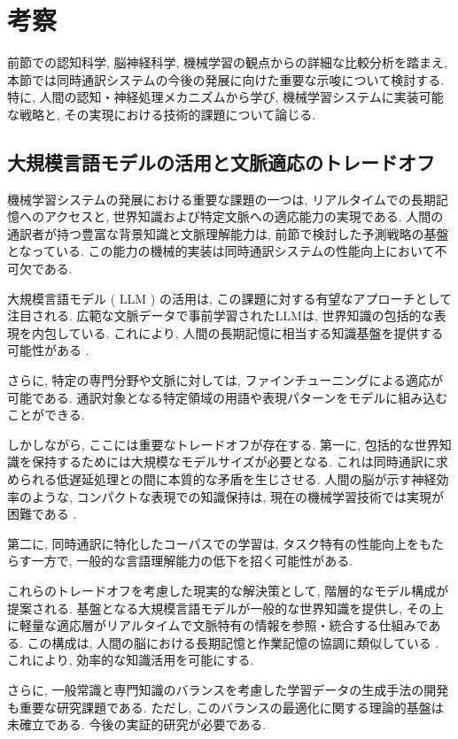 \section{考察}

前節での認知科学, 脳神経科学, 機械学習の観点からの詳細な比較分析を踏まえ, 本節では同時通訳システムの今後の発展に向けた重要な示唆について検討する.
特に, 人間の認知・神経処理メカニズムから学び, 機械学習システムに実装可能な戦略と, その実現における技術的課題について論じる.

\subsection{大規模言語モデルの活用と文脈適応のトレードオフ}

機械学習システムの発展における重要な課題の一つは, リアルタイムでの長期記憶へのアクセスと, 世界知識および特定文脈への適応能力の実現である.
人間の通訳者が持つ豊富な背景知識と文脈理解能力は, 前節で検討した予測戦略の基盤となっている.
この能力の機械的実装は同時通訳システムの性能向上において不可欠である.

大規模言語モデル ( LLM ) の活用は, この課題に対する有望なアプローチとして注目される.
広範な文脈データで事前学習されたLLMは, 世界知識の包括的な表現を内包している.
これにより, 人間の長期記憶に相当する知識基盤を提供する可能性がある \cite{agostinelli2024simulllm}.

さらに, 特定の専門分野や文脈に対しては, ファインチューニングによる適応が可能である.
通訳対象となる特定領域の用語や表現パターンをモデルに組み込むことができる.

しかしながら, ここには重要なトレードオフが存在する.
第一に, 包括的な世界知識を保持するためには大規模なモデルサイズが必要となる.
これは同時通訳に求められる低遅延処理との間に本質的な矛盾を生じさせる.
人間の脳が示す神経効率のような, コンパクトな表現での知識保持は, 現在の機械学習技術では実現が困難である \cite{klein2018interpreter}.

第二に, 同時通訳に特化したコーパスでの学習は, タスク特有の性能向上をもたらす一方で, 一般的な言語理解能力の低下を招く可能性がある.

これらのトレードオフを考慮した現実的な解決策として, 階層的なモデル構成が提案される.
基盤となる大規模言語モデルが一般的な世界知識を提供し, その上に軽量な適応層がリアルタイムで文脈特有の情報を参照・統合する仕組みである.
この構成は, 人間の脳における長期記憶と作業記憶の協調に類似している \cite{baddeley2000episodic}.
これにより, 効率的な知識活用を可能にする.

さらに, 一般常識と専門知識のバランスを考慮した学習データの生成手法の開発も重要な研究課題である.
ただし, このバランスの最適化に関する理論的基盤は未確立である.
今後の実証的研究が必要である.

